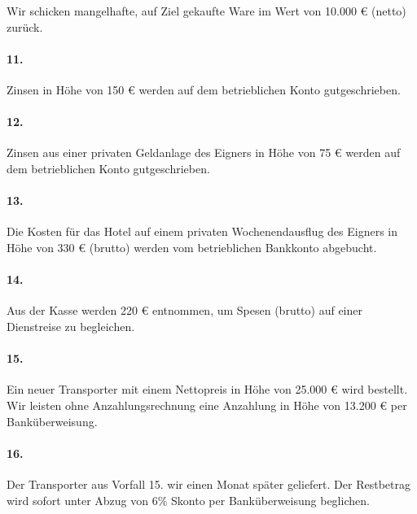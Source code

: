 \documentclass[paper=a4, fontsize=11pt]{scrartcl}
\numberwithin{equation}{section}
\numberwithin{figure}{section}
\numberwithin{table}{section}
\begin{document}
{Wir schicken mangelhafte, auf Ziel gekaufte Ware im Wert von 10.000 € (netto) zurück. \\

\paragraph{11.}

Zinsen in Höhe von 150 € werden auf dem betrieblichen Konto gutgeschrieben. \\

\paragraph{12.}

Zinsen aus einer privaten Geldanlage des Eigners in Höhe von 75 € werden auf dem betrieblichen Konto gutgeschrieben. \\

\paragraph{13.}

Die Kosten für das Hotel auf einem privaten Wochenendausflug des Eigners in Höhe von 330 € (brutto) werden vom betrieblichen Bankkonto abgebucht. \\

\paragraph{14.}

Aus der Kasse werden 220 € entnommen, um Spesen (brutto) auf einer Dienstreise zu begleichen. \\

\paragraph{15.}

Ein neuer Transporter mit einem Nettopreis in Höhe von 25.000 € wird bestellt. Wir leisten ohne Anzahlungsrechnung eine Anzahlung in Höhe von 13.200 € per Banküberweisung. \\

\paragraph{16.}

Der Transporter aus Vorfall 15. wir einen Monat später geliefert. Der Restbetrag wird sofort unter Abzug von $6 \%$ Skonto per Banküberweisung beglichen. \\

}
\end{document}

